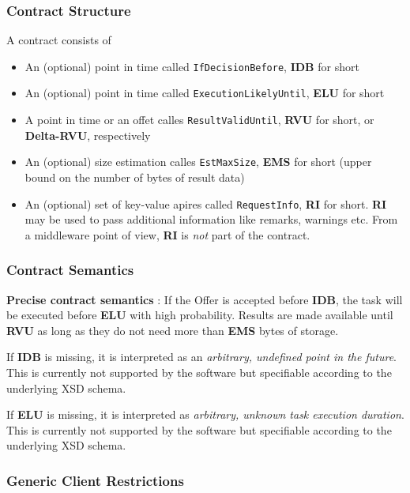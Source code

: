 \documentclass{article}
\begin{document}
\subsubsection{Contract Structure}

A contract consists of

\begin{itemize}
\item
  An (optional) point in time called \verb!IfDecisionBefore!,
  \textbf{IDB} for short
\item
  An (optional) point in time called \verb!ExecutionLikelyUntil!,
  \textbf{ELU} for short
\item
  A point in time or an offet calles \verb!ResultValidUntil!,
  \textbf{RVU} for short, or \textbf{Delta-RVU}, respectively
\item
  An (optional) size estimation calles \verb!EstMaxSize!,
  \textbf{EMS} for short (upper bound on the number of bytes of
  result data)
\item
  An (optional) set of key-value apires called \verb!RequestInfo!,
  \textbf{RI} for short. \textbf{RI} may be used to pass additional
  information like remarks, warnings etc. From a middleware point of
  view, \textbf{RI} is \emph{not} part of the contract.
\end{itemize}
\subsubsection{Contract Semantics}

\textbf{Precise contract semantics} : If the Offer is accepted
before \textbf{IDB}, the task will be executed before \textbf{ELU}
with high probability. Results are made available until
\textbf{RVU} as long as they do not need more than \textbf{EMS}
bytes of storage.

If \textbf{IDB} is missing, it is interpreted as an
\emph{arbitrary, undefined point in the future}. This is currently
not supported by the software but specifiable according to the
underlying XSD schema.

If \textbf{ELU} is missing, it is interpreted as
\emph{arbitrary, unknown task execution duration}. This is
currently not supported by the software but specifiable according
to the underlying XSD schema.

\subsubsection{Generic Client Restrictions}
\end{document}
